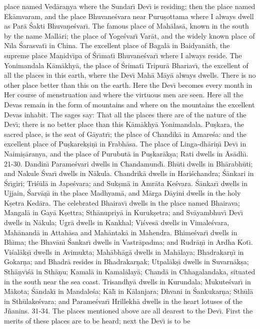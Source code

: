 place named Ved\=ara\d{n}ya where the Sundar\={\i} Dev\={\i} is residing; then the place named Ek\=amvaram, and the place Bhuvane\'svara near Puru\d{s}ottama where I always dwell as Par\=a \'Sakti Bhuva\d{n}e\'svar\={\i}. The famous place of Mah\=alas\=a, known in the south by the name Mall\=ari; the place of Yoge\'svar\={\i} Var\=at, and the widely known place of N\={\i}la \'Sarasvat\={\i} in China. The excellent place of Bagal\=a in Baidyan\=ath, the supreme place Ma\d{n}idv\={\i}pa of \'Sr\={\i}mat\={\i} Bhuvane\'svar\={\i} where I always reside. The Yonimandala K\=am\=akhy\=a, the place of \'Srimat\={\i} Tripur\=a Bhariav\={\i}, the excellent of all the places in this earth, where the Dev\={\i} Mah\=a M\=ay\=a always dwells. There is no other place better than this on the earth. Here the Dev\={\i} becomes every month in Her course of menstruation and where the virtuous men are seen. Here all the Devas remain in the form of mountains and where on the mountains the excellent Devas inhabit. The sages say: That all the places there are of the nature of the Dev\={\i}; there is no better place than this K\=am\=akhy\=a Yonimandala. Pu\d{s}kara, the sacred place, is the seat of G\=ayatr\={\i}; the place of Chandik\=a in Amare\'sa: and the excellent place of Pu\d{s}karek\d{s}i\d{n}\={\i} in Frabh\=asa. The place of Linga-dh\=ari\d{n}\={\i} Dev\={\i} in Naimi\d{s}\=aranya, and the place of Purubut\=a in Pu\d{s}kar\=ak\d{s}a; Rati dwells in \=As\=adh\={\i}.
21-30. Dandin\={\i} Parame\'svari dwells in Chandamund\={\i}. Bh\=uti dwells in Bh\=arabh\=uti; and Nakule \'Svar\={\i} dwells in N\=akula. Chandrik\=a dwells in Hari\'schandra; \'S\=ankari in \'Sr\={\i}giri; Tri\'s\=ul\=a in Jape\'svara; and Suk\d{s}m\=a in \=Amr\=ata Ke\'svara. \'S\=ankar\={\i} dwells in Ujjain, \'Sarv\=a\d{n}\={\i} in the place Madhyam\=a, and M\=arga D\=ayini dwells in the holy K\d{s}etra Ked\=ara. The celebrated Bhairav\={\i} dwells in the place named Bhairava; Mangal\=a in Gay\=a K\d{s}ettra; Sth\=anupriy\=a in Kuruk\d{s}etra; and Sv\=ayambhuv\={\i} Dev\={\i} dwells in N\=akula; Ugr\=a dwells in Kankhal; Vi\'sves\=a dwells in Vimale\'svara, Mah\=anand\=a in Attah\=asa and Mah\=antak\=a in Mahendra. Bhime\'svar\={\i} dwells in Bh\={\i}ma; the Bhav\=an\={\i} \'Sankar\={\i} dwells in Vastr\=apadma; and Rudr\=a\d{n}\={\i} in Ardha Kot\={\i}. Vi\'sal\=ak\d{s}\={\i} dwells in Avimukta; Mah\=abh\=ag\=a dwells in Mah\=alaya; Bhadrakar\d{n}\={\i} in Gokar\d{n}a; and Bhadr\=a resides in Bhadrakar\d{n}ak; Utpal\=ak\d{s}\={\i} dwells in Suvarn\=ak\d{s}a; Sth\=a\d{n}v\={\i}\'s\=a in Sth\=a\d{n}u; Kamal\=a in Kamal\=alay\=a; Chand\=a in Chhagalandaka, situated in the south near the sea coast. Trisandhy\=a dwells in Kurundala; Mukute\'svar\={\i} in M\=akota; \'S\=andak\={\i} in Mandale\'sa; K\=al\={\i} in K\=alanjara; Dhvani in \'Sankukar\d{n}a; Sth\=ul\=a in Sth\=ulake\'svara; and Parame\'svar\={\i} Hrillekh\=a dwells in the heart lotuses of the J\~nanins.
31-34. The places mentioned above are all dearest to the Dev\={\i}. First the merits of these places are to be heard; next the Dev\={\i} is to be

